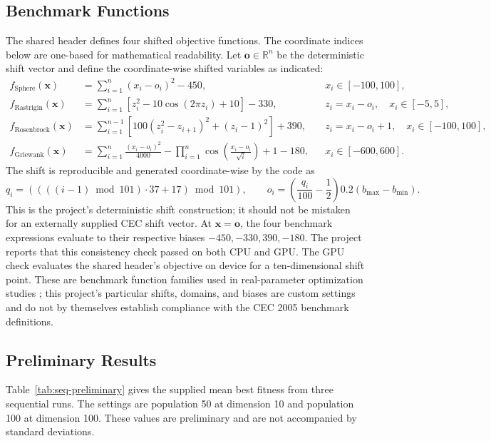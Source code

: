\documentclass[conference]{IEEEtran}
\newcommand{\R}{\mathbb{R}}
\begin{document}
\subsection{Benchmark Functions}
\label{sec:benchmarks}
The shared header defines four shifted objective functions. The coordinate
indices below are one-based for mathematical readability. Let
$\mathbf{o}\in\R^n$ be the deterministic shift vector and define the
coordinate-wise shifted variables as indicated:
\begin{align}
 f_{\mathrm{Sphere}}(\mathbf{x})
 &= \sum_{i=1}^{n}(x_i-o_i)^2 - 450,
 && x_i\in[-100,100],\\
 f_{\mathrm{Rastrigin}}(\mathbf{x})
 &= \sum_{i=1}^{n}\left[z_i^2-10\cos(2\pi z_i)+10\right]-330,
 && z_i=x_i-o_i,\quad x_i\in[-5,5],\\
 f_{\mathrm{Rosenbrock}}(\mathbf{x})
 &= \sum_{i=1}^{n-1}
 \left[100(z_i^2-z_{i+1})^2+(z_i-1)^2\right]+390,
 && z_i=x_i-o_i+1,\quad x_i\in[-100,100],\\
 f_{\mathrm{Griewank}}(\mathbf{x})
 &= \sum_{i=1}^{n}\frac{(x_i-o_i)^2}{4000}
 -\prod_{i=1}^{n}\cos\!\left(\frac{x_i-o_i}{\sqrt{i}}\right)+1-180,
 && x_i\in[-600,600].
\end{align}
The shift is reproducible and generated coordinate-wise by the code as
\begin{equation}
 q_i=((((i-1)\bmod 101)\cdot37+17)\bmod101),\qquad
 o_i=\left(\frac{q_i}{100}-\frac{1}{2}\right)
       0.2(b_{\max}-b_{\min}).
\end{equation}
This is the project's deterministic shift construction; it should not be
mistaken for an externally supplied CEC shift vector. At $\mathbf{x}=\mathbf{o}$,
the four benchmark expressions evaluate to their respective biases
$-450,-330,390,-180$. The project reports that this consistency check passed
on both CPU and GPU. The GPU check evaluates the shared header's objective
on device for a ten-dimensional shift point. These are benchmark function
families used in real-parameter optimization studies
\cite{suganthan2005cec}; this project's particular shifts, domains, and
biases are custom settings and do not by themselves establish compliance
with the CEC 2005 benchmark definitions.

\subsection{Preliminary Results}
\label{sec:preliminary}
Table~\ref{tab:seq-preliminary} gives the supplied mean best fitness from
three sequential runs. The settings are population 50 at dimension 10 and
population 100 at dimension 100. These values are preliminary and are not
accompanied by standard deviations.
\end{document}
